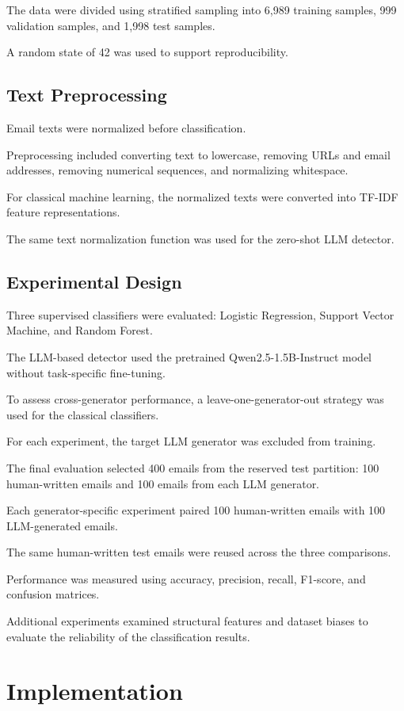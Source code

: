 \documentclass[sigconf,nonacm]{acmart}
\begin{document}
The data were divided using stratified
sampling into 6,989 training samples,
999 validation samples, and
1,998 test samples.

A random state of 42 was used to support
reproducibility.

\subsection{Text Preprocessing}

Email texts were normalized before
classification.

Preprocessing included converting text
to lowercase, removing URLs and email
addresses, removing numerical sequences,
and normalizing whitespace.

For classical machine learning, the
normalized texts were converted into
TF-IDF feature representations.

The same text normalization function
was used for the zero-shot LLM detector.

\subsection{Experimental Design}

Three supervised classifiers were evaluated:
Logistic Regression, Support Vector Machine,
and Random Forest.

The LLM-based detector used the pretrained
Qwen2.5-1.5B-Instruct model without
task-specific fine-tuning.

To assess cross-generator performance,
a leave-one-generator-out strategy was
used for the classical classifiers.

For each experiment, the target LLM
generator was excluded from training.

The final evaluation selected 400 emails
from the reserved test partition:
100 human-written emails and 100 emails
from each LLM generator.

Each generator-specific experiment paired
100 human-written emails with 100
LLM-generated emails.

The same human-written test emails were
reused across the three comparisons.

Performance was measured using accuracy,
precision, recall, F1-score, and
confusion matrices.

Additional experiments examined structural
features and dataset biases to evaluate
the reliability of the classification
results.


\section{Implementation}
\end{document}
